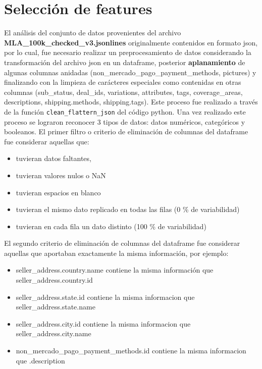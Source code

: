 \documentclass[a4paper,10pt]{article}
\begin{document}
\section*{Selección de features}
El análisis del conjunto de datos provenientes del archivo \textbf{MLA\_100k\_checked\_v3.jsonlines} originalmente contenidos en formato json, por lo cual, fue necesario realizar un 
preprocesamiento de datos considerando la transformación del archivo json en un dataframe, posterior \textbf{aplanamiento} de algunas columnas anidadas (non\_mercado\_pago\_payment\_methods,
pictures) y finalizando con la limpieza de carácteres especiales como contenidas en otras columnas (sub\_status, deal\_ids, variations, attributes, tags, coverage\_areas, descriptions,
shipping.methods, shipping.tags). Este proceso fue realizado a través de la función \texttt{clean\_flattern\_json} del código python.
\newline
Una vez realizado este proceso se lograron reconocer 3 tipos de datos: datos numéricos, categóricos y booleanos.
El primer filtro o criterio de eliminación de columnas del dataframe fue considerar aquellas que:
\begin{itemize}
    \item tuvieran datos faltantes,
    \item tuvieran valores nulos o NaN
    \item tuvieran espacios en blanco
    \item tuvieran el mismo dato replicado en todas las filas (0 \% de  variabilidad)
    \item tuvieran en cada fila un dato distinto (100 \% de variabilidad)
\end{itemize}

El segundo criterio de eliminación de columnas del dataframe fue considerar aquellas que aportaban exactamente la misma información, por ejemplo:
\begin{itemize}
    \item seller\_address.country.name contiene la misma información que seller\_address.country.id
    \item seller\_address.state.id contiene la misma informacion que seller\_address.state.name
    \item seller\_address.city.id contiene la misma informacion que seller\_address.city.name
    \item non\_mercado\_pago\_payment\_methods.id contiene la misma informacion que .description
\end{itemize}
\end{document}
